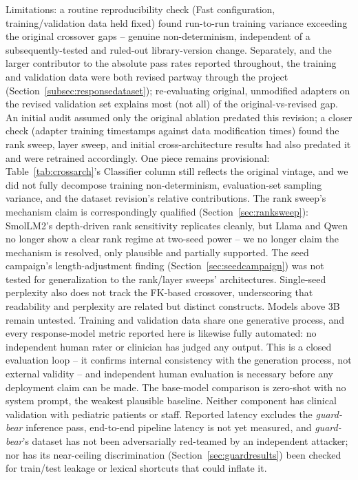 \documentclass[pdflatex,sn-mathphys-num]{sn-jnl}%
\begin{document}
Limitations: a routine reproducibility check (Fast configuration, training/validation data held fixed) found run-to-run training variance exceeding the original crossover gaps -- genuine non-determinism, independent of a subsequently-tested and ruled-out library-version change. Separately, and the larger contributor to the absolute pass rates reported throughout, the training and validation data were both revised partway through the project (Section~\ref{subsec:responsedataset}); re-evaluating original, unmodified adapters on the revised validation set explains most (not all) of the original-vs-revised gap. An initial audit assumed only the original ablation predated this revision; a closer check (adapter training timestamps against data modification times) found the rank sweep, layer sweep, and initial cross-architecture results had also predated it and were retrained accordingly. One piece remains provisional: Table~\ref{tab:crossarch}'s Classifier column still reflects the original vintage, and we did not fully decompose training non-determinism, evaluation-set sampling variance, and the dataset revision's relative contributions. The rank sweep's mechanism claim is correspondingly qualified (Section~\ref{sec:ranksweep}): SmolLM2's depth-driven rank sensitivity replicates cleanly, but Llama and Qwen no longer show a clear rank regime at two-seed power -- we no longer claim the mechanism is resolved, only plausible and partially supported. The seed campaign's length-adjustment finding (Section~\ref{sec:seedcampaign}) was not tested for generalization to the rank/layer sweeps' architectures. Single-seed perplexity also does not track the FK-based crossover, underscoring that readability and perplexity are related but distinct constructs. Models above 3B remain untested. Training and validation data share one generative process, and every response-model metric reported here is likewise fully automated: no independent human rater or clinician has judged any output. This is a closed evaluation loop -- it confirms internal consistency with the generation process, not external validity -- and independent human evaluation is necessary before any deployment claim can be made. The base-model comparison is zero-shot with no system prompt, the weakest plausible baseline. Neither component has clinical validation with pediatric patients or staff. Reported latency excludes the \textit{guard-bear} inference pass, end-to-end pipeline latency is not yet measured, and \textit{guard-bear}'s dataset has not been adversarially red-teamed by an independent attacker; nor has its near-ceiling discrimination (Section~\ref{sec:guardresults}) been checked for train/test leakage or lexical shortcuts that could inflate it.
\end{document}
